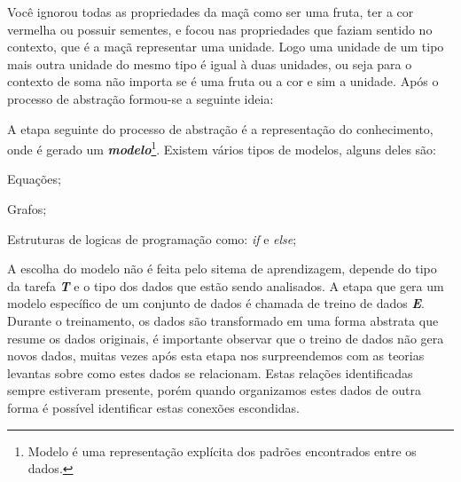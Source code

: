 Você ignorou todas as propriedades da maçã como ser uma fruta, ter a cor vermelha  ou possuir sementes, e focou nas propriedades que faziam sentido no contexto, que é a maçã representar uma unidade. Logo uma unidade de um tipo mais outra unidade do mesmo tipo é igual à duas unidades, ou seja para o contexto de soma não importa se é uma fruta ou a cor e sim a unidade. Após o processo de abstração formou-se a seguinte ideia:


\begin{figure}[h!]
	\centering
\end{figure}

A etapa seguinte do processo de abstração é a representação do conhecimento, onde é gerado um 
\textbf{\textit{modelo}}\footnote{Modelo é uma representação explícita dos padrões encontrados entre os dados.}. 
Existem vários tipos de modelos, alguns deles são:
\begin{alineascomponto}
    \item Equações;
    \item Grafos;
    \item Estruturas de logicas de programação como: \textit{if} e \textit{else}; 
\end{alineascomponto} 

A escolha do modelo não é feita pelo sitema de aprendizagem, depende do tipo da tarefa \textbf{\textit{T}} e o tipo dos dados
que estão sendo analisados. A etapa que gera um modelo específico de um conjunto de dados é chamada de treino de dados \textbf{\textit{E}}. 
Durante o treinamento, os dados são transformado em uma forma abstrata que resume os dados originais, é importante observar que o  
treino de dados não gera novos dados, muitas vezes após esta etapa nos surpreendemos com as teorias levantas sobre como 
estes dados se relacionam. Estas relações identificadas sempre estiveram presente, porém quando organizamos estes dados de outra forma
é possível identificar estas conexões escondidas.

